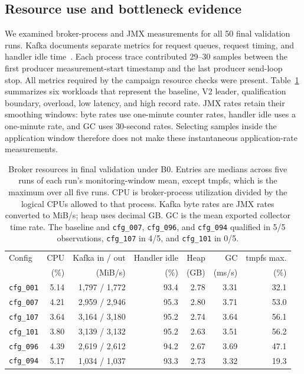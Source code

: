 \documentclass[10pt]{article}
\begin{document}
\subsection{Resource use and bottleneck evidence}
\label{sec:kafka-resources}

We examined broker-process and JMX measurements for all 50 final validation
runs. Kafka documents separate metrics for request queues, request timing, and
handler idle time~\cite{kafkamonitoring}. Each process trace contributed 29--30 samples between the first
producer measurement-start timestamp and the last producer send-loop stop. All metrics required by the campaign resource checks were present. Table~\ref{tab:kafka-resources} summarizes six workloads
that represent the baseline, V2 leader, qualification boundary, overload,
low latency, and high record rate. JMX rates retain their smoothing windows:
byte rates use one-minute counter rates, handler idle uses a one-minute rate,
and GC uses 30-second rates. Selecting samples inside the application window
therefore does not make these instantaneous application-rate measurements.

\begin{table}[H]
\centering
\small
\setlength{\tabcolsep}{5pt}
\begin{tabular}{@{}lrrrrrr@{}}
\toprule
Config & CPU & Kafka in / out & Handler idle & Heap & GC & tmpfs max. \\
 & (\%) & (MiB/s) & (\%) & (GB) & (ms/s) & (\%) \\
\midrule
\texttt{cfg\_001} & 5.14 & 1,797 / 1,772 & 93.4 & 2.78 & 3.31 & 32.1 \\
\texttt{cfg\_007} & 4.21 & 2,959 / 2,946 & 95.3 & 2.80 & 3.71 & 53.0 \\
\texttt{cfg\_107} & 3.64 & 3,164 / 3,180 & 95.2 & 2.74 & 3.64 & 56.1 \\
\texttt{cfg\_101} & 3.80 & 3,139 / 3,132 & 95.2 & 2.63 & 3.51 & 56.2 \\
\texttt{cfg\_096} & 4.39 & 2,619 / 2,612 & 94.2 & 2.67 & 3.69 & 47.1 \\
\texttt{cfg\_094} & 5.17 & 1,034 / 1,037 & 93.3 & 2.73 & 3.32 & 19.3 \\
\bottomrule
\end{tabular}
\caption{Broker resources in final validation under B0. Entries are medians
across five runs of each run's monitoring-window mean, except tmpfs, which
is the maximum over all five runs. CPU is broker-process utilization divided
by the logical CPUs allowed to that process. Kafka byte rates are JMX rates converted to MiB/s;
heap uses decimal GB. GC is the mean exported collector time rate.
The baseline and \texttt{cfg\_007}, \texttt{cfg\_096}, and \texttt{cfg\_094}
qualified in 5/5 observations, \texttt{cfg\_107} in 4/5, and \texttt{cfg\_101} in 0/5.}
\label{tab:kafka-resources}
\end{table}
\end{document}
